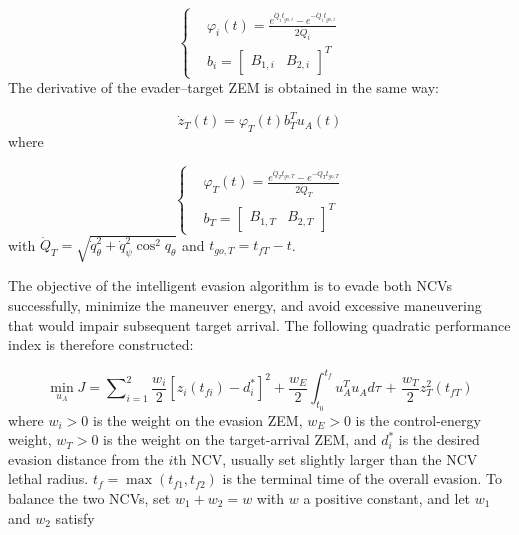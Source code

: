 \begin{equation}
\label{eq:20}
\left\{
\begin{aligned}
& {\varphi _i}(t) = \frac{{{e^{{{\dot Q}_i}{t_{go,i}}}} - {e^{ - {{\dot Q}_i}{t_{go,i}}}}}}{{2{{\dot Q}_i}}} \\
& {b_i} = {\left[ {\begin{array}{*{20}{c}}
  {{B_{1,i}}}&{{B_{2,i}}}
\end{array}} \right]^T}
\end{aligned}
\right.
\end{equation}
The derivative of the evader--target ZEM is obtained in the same way:

\begin{equation}
\label{eq:21}
{\dot z_T}(t) = {\varphi _T}(t)b_T^T{u_A}(t)
\end{equation}
where

\begin{equation}
\label{eq:22}
\left\{
\begin{aligned}
& {\varphi _T}(t) = \frac{{{e^{{{\dot Q}_T}{t_{go,T}}}} - {e^{ - {{\dot Q}_T}{t_{go,T}}}}}}{{2{{\dot Q}_T}}} \\
& {b_T} = {\left[ {\begin{array}{*{20}{c}}
  {{B_{1,T}}}&{{B_{2,T}}}
\end{array}} \right]^T}
\end{aligned}
\right.
\end{equation}
with ${\dot Q_T} = \sqrt {\dot q_\theta ^2 + \dot q_\psi ^2{{\cos }^2}{q_\theta }} $ and ${t_{go,T}} = {t_{fT}} - t$.

The objective of the intelligent evasion algorithm is to evade both NCVs successfully, minimize the maneuver energy, and avoid excessive maneuvering that would impair subsequent target arrival. The following quadratic performance index is therefore constructed:

\begin{equation}
\label{eq:23}
\mathop {\min }\limits_{{u_A}} J = \sum\nolimits_{i = 1}^2 {\frac{{{w_i}}}{2}{{\left[ {z_i\left( {{t_{fi}}} \right) - d_i^*} \right]}^2}}  + \frac{{{w_E}}}{2}\int_{{t_0}}^{{t_f}} {u_A^T{u_A}d\tau {\text{ + }}\frac{{{w_T}}}{2}z_T^2\left( {{t_{fT}}} \right)}
\end{equation}
where ${w_i} > 0$ is the weight on the evasion ZEM, ${w_E} > 0$ is the control-energy weight, ${w_T} > 0$ is the weight on the target-arrival ZEM, and $d_i^*$ is the desired evasion distance from the $i$th NCV, usually set slightly larger than the NCV lethal radius. ${t_f} = \max ({t_{f1}},{t_{f2}})$ is the terminal time of the overall evasion. To balance the two NCVs, set ${w_1} + {w_2} = w$ with $w$ a positive constant, and let ${w_1}$ and ${w_2}$ satisfy

